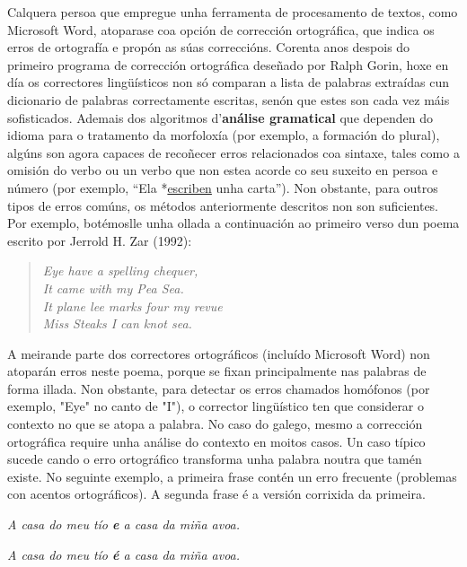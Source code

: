 \begin{multicols}{2}
Calquera persoa que empregue unha ferramenta de procesamento de textos, como Microsoft Word, atoparase coa opción de corrección ortográfica, que indica os erros de ortografía e propón as súas correccións. Corenta anos despois do primeiro programa de corrección ortográfica deseñado por Ralph Gorin, hoxe en día os correctores lingüísticos non só comparan a lista de palabras extraídas cun dicionario de palabras correctamente escritas, senón que estes son cada vez máis sofisticados. Ademais dos algoritmos d'\textbf{análise gramatical} que dependen do idioma para o tratamento da morfoloxía (por exemplo, a formación do plural), algúns son agora capaces de recoñecer erros relacionados coa sintaxe, tales como a omisión do verbo ou un verbo que non estea acorde co seu suxeito en persoa e número (por exemplo, “Ela *\underline{escriben} unha carta”). Non obstante, para outros tipos de erros comúns, os métodos anteriormente descritos non son suficientes. Por exemplo, botémoslle unha ollada a continuación ao primeiro verso dun poema escrito por Jerrold H. Zar (1992): 

\begin{verse}
\textit{Eye have a spelling chequer,} \\
\textit{It came with my Pea Sea.} \\
\textit{It plane lee marks four my revue} \\
\textit{Miss Steaks I can knot sea.} 
\end{verse}

A meirande parte dos correctores ortográficos (incluído Microsoft Word) non atoparán erros neste poema, porque se fixan principalmente nas palabras de forma illada. Non obstante, para detectar os erros chamados homófonos (por exemplo, "Eye" no canto de "I"), o corrector lingüístico ten que considerar o contexto no que se atopa a palabra. No caso do galego, mesmo a corrección ortográfica require unha análise do contexto en moitos casos. Un caso típico sucede cando o erro ortográfico transforma unha palabra noutra que tamén existe. No seguinte exemplo, a primeira frase contén un erro frecuente (problemas con acentos ortográficos). A segunda frase é a versión corrixida da primeira.

\textit{A casa do meu tío \textbf{e} a casa da miña avoa.}

\textit{A casa do meu tío \textbf{é} a casa da miña avoa.} 
 

\end{multicols}

